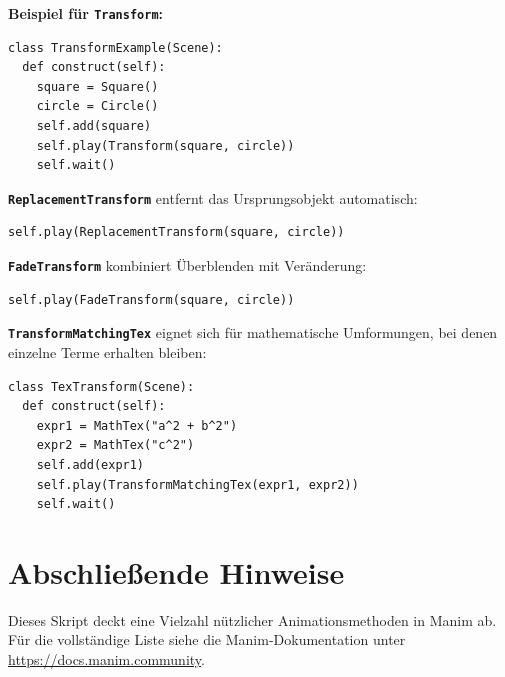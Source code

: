 \documentclass[12pt]{article}
\begin{document}
\textbf{Beispiel für \texttt{Transform}:}
\begin{verbatim}
class TransformExample(Scene):
  def construct(self):
    square = Square()
    circle = Circle()
    self.add(square)
    self.play(Transform(square, circle))
    self.wait()
\end{verbatim}

\textbf{\texttt{ReplacementTransform}} entfernt das Ursprungsobjekt automatisch:
\begin{verbatim}
self.play(ReplacementTransform(square, circle))
\end{verbatim}

\textbf{\texttt{FadeTransform}} kombiniert Überblenden mit Veränderung:
\begin{verbatim}
self.play(FadeTransform(square, circle))
\end{verbatim}

\textbf{\texttt{TransformMatchingTex}} eignet sich für mathematische Umformungen, bei denen einzelne Terme erhalten bleiben:

\begin{verbatim}
class TexTransform(Scene):
  def construct(self):
    expr1 = MathTex("a^2 + b^2")
    expr2 = MathTex("c^2")
    self.add(expr1)
    self.play(TransformMatchingTex(expr1, expr2))
    self.wait()
\end{verbatim}

\section*{Abschließende Hinweise}
Dieses Skript deckt eine Vielzahl nützlicher Animationsmethoden in Manim ab. Für die vollständige Liste siehe die Manim-Dokumentation unter \url{https://docs.manim.community}.
\end{document}
